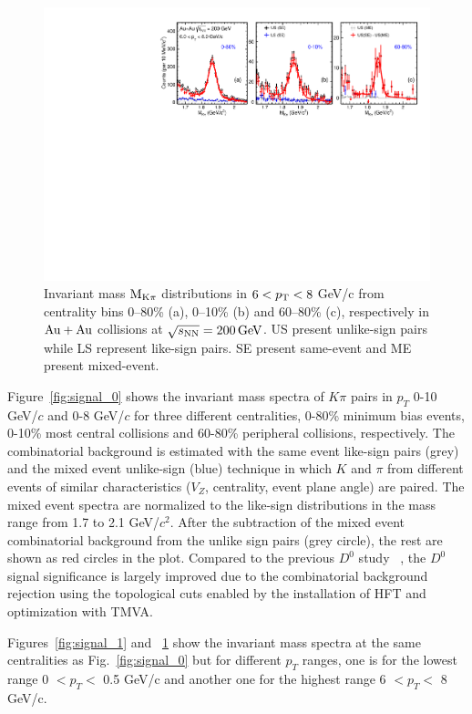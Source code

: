 \documentclass[%
 reprint,	
 amsmath,amssymb,
 aps,
 prc,
]{revtex4-1}
\begin{document}
\begin{figure}
\centering
\includegraphics[width=1.0\textwidth]{fig/signal_6_8GeV.pdf}
\caption{Invariant mass $\rm M_{K\pi}$ distributions in $6 < p_{\rm T} < 8$ GeV/c from centrality bins 0--80\% (a), 0--10\% (b) and 60--80\% (c), respectively in ${\rm{Au + Au}}$ collisions at ${\sqrt{s_{\rm NN}} = \rm{200\,GeV}}$. US present unlike-sign pairs while LS represent like-sign pairs. SE present same-event and ME present mixed-event.}
\label{fig:signal_2} 
\end{figure}

Figure~\ref{fig:signal_0} shows the invariant mass spectra of $K\pi$ pairs in $p_{T}$ 0-10 GeV/$c$ and 0-8 GeV/$c$ for three different centralities, 0-80\% minimum bias events, 0-10\% most central collisions and 60-80\% peripheral collisions, respectively. The combinatorial background is estimated with the same event like-sign pairs (grey) and the mixed event unlike-sign (blue) technique in which $K$ and $\pi$ from different events of similar characteristics ($V_{Z}$, centrality, event plane angle) are paired. The mixed event spectra are normalized to the like-sign distributions in the mass range from 1.7 to 2.1 GeV/$c^2$. After the subtraction of the mixed event combinatorial background from the unlike sign pairs (grey circle), the rest are shown as red circles in the plot. Compared to the previous $D^0$ study ~\cite{Star_D_RAA}, the $D^0$ signal significance is largely improved due to the combinatorial background rejection using the topological cuts enabled by the installation of HFT and optimization with TMVA. 

Figures~\ref{fig:signal_1} and ~\ref{fig:signal_2} show the invariant mass spectra at the same centralities as Fig.~\ref{fig:signal_0} but for different $p_T$ ranges, one is for the lowest range 0 $< p_T <$ 0.5 GeV/c and another one for the highest range 6 $< p_T <$ 8 GeV/c.
\end{document}
